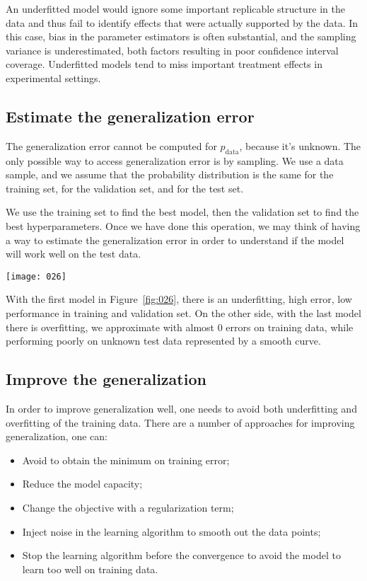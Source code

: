 An underfitted model would ignore some important replicable structure in the data and thus fail to identify effects that were actually supported by the data. In this case, bias in the parameter estimators is often substantial, and the sampling variance is underestimated, both factors resulting in poor confidence interval coverage. Underfitted models tend to miss important treatment effects in experimental settings.

\subsection{Estimate the generalization error}
The generalization error cannot be computed for \(p_{\text{data}}\), because it's unknown. The only possible way to access generalization error is by sampling. We use a data sample, and we assume that the probability distribution is the same for the training set, for the validation set, and for the test set.

We use the training set to find the best model, then the validation set to find the best hyperparameters. Once we have done this operation, we may think of having a way to estimate the generalization error in order to understand if the model will work well on the test data.

\begin{example}
\begin{center}
    \texttt{[image: 026]}
    \label{fig:026}
\end{center}
With the first model in Figure~\ref{fig:026}, there is an underfitting, high error, low performance in training and validation set. On the other side, with the last model there is overfitting, we approximate with almost 0 errors on training data, while performing poorly on unknown test data represented by a smooth curve.

\end{example}

\subsection{Improve the generalization}
In order to improve generalization well, one needs to avoid both underfitting and overfitting of the training data. There are a number of approaches for improving generalization, one can:
\begin{itemize}
    \item
    Avoid to obtain the minimum on training error;
    \item
    Reduce the model capacity;
    \item
    Change the objective with a regularization term;
    \item
    Inject noise in the learning algorithm to smooth out the data points;
    \item
    Stop the learning algorithm before the convergence to avoid the model to learn too well on training data.
\end{itemize}

